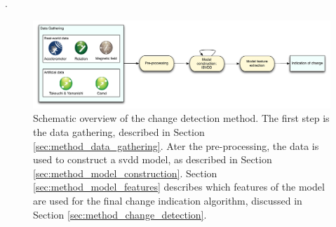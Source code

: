 
.

\begin{figure}
  \centering
    \includegraphics[width=\textwidth,height=\textheight,keepaspectratio]{./Figures/chapter4/method_setup_short.pdf}
  \caption[Method setup]{Schematic overview of the change detection method. The first step is the data gathering, described in Section \ref{sec:method_data_gathering}. Ater the pre-processing, the data is used to construct a \gls{svdd} model, as described in Section \ref{sec:method_model_construction}. Section \ref{sec:method_model_features} describes which features of the model are used for the final change indication algorithm, discussed in Section \ref{sec:method_change_detection}.}
  \label{fig:method_overview_short}
\end{figure}






% 
% 

